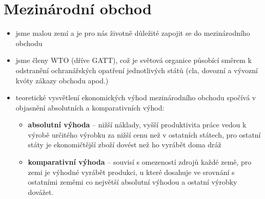 \section*{Mezinárodní obchod}
\begin{itemize}
    \item jsme malou zemí a je pro nás životně důležité zapojit se do mezinárodního obchodu
    \item jsme členy WTO (dříve GATT), což je světová organice působící směrem k odstranění ochranářských opatření jednotlivých států (cla, dovozní a vývozní kvóty zákazy obchodu apod.)
    \item teoretické vysvětlení ekonomických výhod mezinárodního obchodu spočívá v objasnění absolutních a komparativních výhod:
        \begin{itemize}
            \item \textbf{absolutní výhoda} -- nižší náklady, vyšší produktivita práce vedou k výrobě určitého výrobku za nižší cenu než v ostatních státech, pro ostatní státy je ekonomičtější zboží dovést než ho vyrábět doma dráž
            \item \textbf{komparativní výhoda} -- souvisí s omezeností zdrojů každé země, pro zemi je výhodné vyrábět produkci, u které dosahuje ve srovnání s ostatními zeměmi co největší absolutní výhodou a ostatní výrobky dovážet.
        \end{itemize}
\end{itemize}
